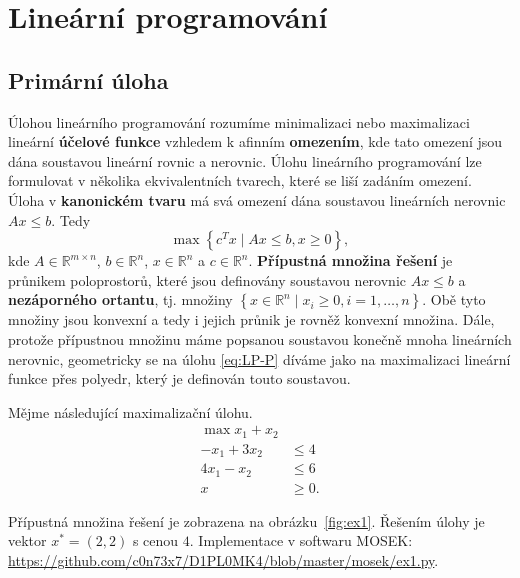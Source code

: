 \chapter{Lineární programování}

\section{Primární úloha}

Úlohou lineárního programování rozumíme minimalizaci nebo maximalizaci lineární \textbf{účelové funkce} vzhledem k afinním \textbf{omezením}, kde tato omezení jsou dána soustavou lineární rovnic a nerovnic. Úlohu lineárního programování lze formulovat v několika ekvivalentních tvarech, které se liší zadáním omezení. Úloha v \textbf{kanonickém tvaru} má svá omezení dána soustavou lineárních nerovnic $Ax \leq b$. Tedy
\begin{equation}\tag{LP-P}
    \max \left\{ c^T x \mid Ax \leq b, x \geq 0 \right\},
    \label{eq:LP-P}
\end{equation}
kde $A \in \mathbb{R}^{m \times n}$, $b \in \mathbb{R}^n$, $x \in \mathbb{R}^n$ a $c \in \mathbb{R}^n$. \textbf{Přípustná množina řešení} je průnikem poloprostorů, které jsou definovány soustavou nerovnic $Ax \leq b$ a \textbf{nezáporného ortantu}, tj. množiny $\left\{ x \in \mathbb{R}^n \mid x_i \geq 0, i = 1, \dots, n \right\}$. Obě tyto množiny jsou konvexní a tedy i jejich průnik je rovněž konvexní množina. Dále, protože přípustnou množinu máme popsanou soustavou konečně mnoha lineárních nerovnic, geometricky se na úlohu \ref{eq:LP-P} díváme jako na maximalizaci lineární funkce přes polyedr, který je definován touto soustavou.

\begin{pr}
Mějme následující maximalizační úlohu.
\begin{equation}\tag{P1}
    \begin{split}
        \max x_1 + x_2 &       \\
        - x_1 + 3 x_2  &\leq 4 \\
        4 x_1 -   x_2  &\leq 6 \\
        x &\geq 0.
    \end{split}
    \label{eq:P1}
\end{equation}

Přípustná množina řešení je zobrazena na obrázku~\ref{fig:ex1}. Řešením úlohy je vektor $x^* = (2, 2)$ s cenou $4$. Implementace v softwaru MOSEK: \url{https://github.com/c0n73x7/D1PL0MK4/blob/master/mosek/ex1.py}.
\end{pr}

